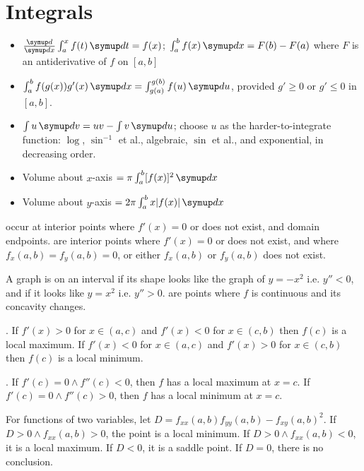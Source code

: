 \documentclass{slnotes}
\begin{document}
\section{Integrals}
\begin{itemize}
\item \(\frac{\sld}{\sld x}\int^x_a f(t)\,\sld t = f(x)\); \(\int^b_a f(x)\,\sld x = F(b) - F(a)\) where \(F\) is an antiderivative of \(f\) on \([a, b]\)
\item \(\int^b_a f(g(x))g'(x)\,\sld x = \int^{g(b)}_{g(a)}f(u)\,\sld u\), provided \(g' \ge 0\) or \(g' \le 0\) in \([a, b]\).
\item \(\int u\,\sld v = uv - \int v\,\sld u\); choose \(u\) as the harder-to-integrate function: \(\log\), \(\sin^{-1}\) et al., algebraic, \(\sin\) et al., and exponential, in decreasing order.
\item Volume about \(x\)-axis \(= \pi\int^b_a[f(x)]^2\,\sld x\)
\item Volume about \(y\)-axis \(= 2\pi\int^b_a x\lvert f(x) \rvert\,\sld x\)
\end{itemize}

 occur at interior points where \(f'(x) = 0\) or does not exist, and domain endpoints.  are interior points where \(f'(x) = 0\) or does not exist, and where \(f_x(a, b) = f_y(a, b) = 0\), or either \(f_x(a, b)\) or \(f_y(a, b)\) does not exist.

A graph is  on an interval if its shape looks like the graph of \(y = -x^2\) i.e. \(y'' < 0\), and  if it looks like \(y = x^2\) i.e. \(y'' > 0\).  are points where \(f\) is continuous and its concavity changes.

. If \(f'(x) > 0\) for \(x \in (a, c)\) and \(f'(x) < 0\) for \(x \in (c, b)\) then \(f(c)\) is a local maximum. If \(f'(x) < 0\) for \(x \in (a, c)\) and \(f'(x) > 0\) for \(x \in (c, b)\) then \(f(c)\) is a local minimum.

. If \(f'(c) = 0 \land f''(c) < 0\), then \(f\) has a local maximum at \(x = c\). If \(f'(c) = 0 \land f''(c) > 0\), then \(f\) has a local minimum at \(x = c\).

For functions of two variables, let \(D = f_{xx}(a,b)f_{yy}(a,b) - f_{xy}(a,b)^2\). If \(D > 0 \land f_{xx}(a, b) > 0\), the point is a local minimum. If \(D > 0 \land f_{xx}(a, b) < 0\), it is a local maximum. If \(D < 0\), it is a saddle point. If \(D = 0\), there is no conclusion.
\end{document}
